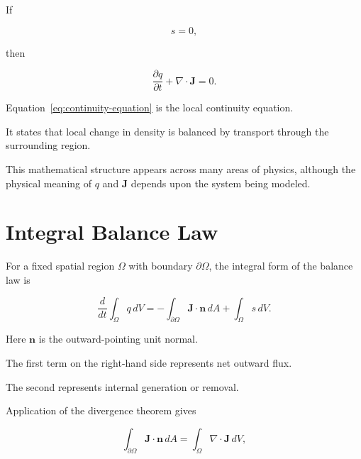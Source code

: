 \documentclass[12pt,oneside]{book}
\begin{document}
If

\begin{equation}
    s
    =
    0,
\end{equation}

then

\begin{equation}
    \frac{\partial q}{\partial t}
    +
    \nabla\cdot\mathbf{J}
    =
    0.
    \label{eq:continuity-equation}
\end{equation}

Equation~\eqref{eq:continuity-equation} is the local continuity
equation.

It states that local change in density is balanced by transport
through the surrounding region.

This mathematical structure appears across many areas of
physics, although the physical meaning of \(q\) and
\(\mathbf{J}\) depends upon the system being modeled.


\section{Integral Balance Law}
\label{sec:integral-balance-law}

For a fixed spatial region \(\Omega\) with boundary
\(\partial\Omega\), the integral form of the balance law is

\begin{equation}
    \frac{d}{dt}
    \int_{\Omega}
        q
    \,dV
    =
    -
    \int_{\partial\Omega}
        \mathbf{J}\cdot\mathbf{n}
    \,dA
    +
    \int_{\Omega}
        s
    \,dV.
    \label{eq:integral-balance}
\end{equation}

Here \(\mathbf{n}\) is the outward-pointing unit normal.

The first term on the right-hand side represents net outward
flux.

The second represents internal generation or removal.

Application of the divergence theorem gives

\begin{equation}
    \int_{\partial\Omega}
        \mathbf{J}\cdot\mathbf{n}
    \,dA
    =
    \int_{\Omega}
        \nabla\cdot\mathbf{J}
    \,dV,
\end{equation}
\end{document}
